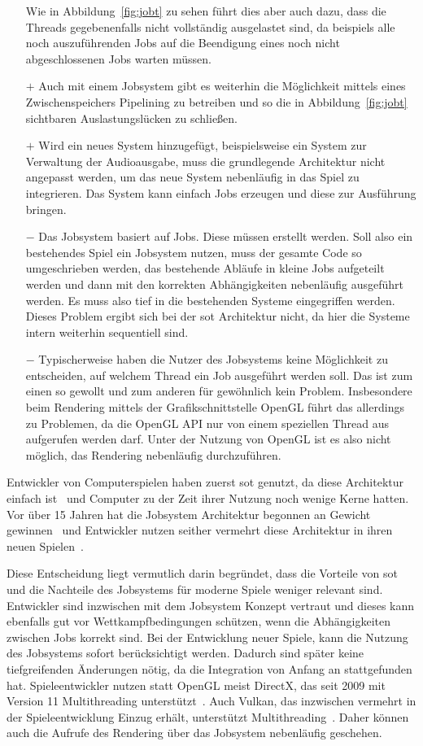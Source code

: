 \begin{itemize}
	Wie in Abbildung~\ref{fig:jobt} zu sehen führt dies aber auch dazu, dass die Threads gegebenenfalls nicht vollständig ausgelastet sind, da beispiels alle noch auszuführenden Jobs auf die Beendigung eines noch nicht abgeschlossenen Jobs warten müssen.
	\item[$+$] Auch mit einem Jobsystem gibt es weiterhin die Möglichkeit mittels eines Zwischenspeichers Pipelining zu betreiben und so die in Abbildung~\ref{fig:jobt} sichtbaren Auslastungslücken zu schließen.
	\item[$+$] Wird ein neues System hinzugefügt, beispielsweise ein System zur Verwaltung der Audioausgabe, muss die grundlegende Architektur nicht angepasst werden, um das neue System nebenläufig in das Spiel zu integrieren. Das System kann einfach Jobs erzeugen und diese zur Ausführung bringen.
	\item[$-$] Das Jobsystem basiert auf Jobs. Diese müssen erstellt werden. Soll also ein bestehendes Spiel ein Jobsystem nutzen, muss der gesamte Code so umgeschrieben werden, das bestehende Abläufe in kleine Jobs aufgeteilt werden und dann mit den korrekten Abhängigkeiten nebenläufig ausgeführt werden. Es muss also tief in die bestehenden Systeme eingegriffen werden. Dieses Problem ergibt sich bei der \ac{sot} Architektur nicht, da hier die Systeme intern weiterhin sequentiell sind.
	\item[$-$] Typischerweise haben die Nutzer des Jobsystems keine Möglichkeit zu entscheiden, auf welchem Thread ein Job ausgeführt werden soll. Das ist zum einen so gewollt und zum anderen für gewöhnlich kein Problem. Insbesondere beim Rendering mittels der Grafikschnittstelle OpenGL führt das allerdings zu Problemen, da die OpenGL API nur von einem speziellen Thread aus aufgerufen werden darf. Unter der Nutzung von OpenGL ist es also nicht möglich, das Rendering nebenläufig durchzuführen.
\end{itemize}

Entwickler von Computerspielen haben zuerst \ac{sot} genutzt, da diese Architektur einfach ist~\cite{Genova2015,Tatarchuk2014} und Computer zu der Zeit ihrer Nutzung noch wenige Kerne hatten. Vor über 15 Jahren hat die Jobsystem Architektur begonnen an Gewicht gewinnen~\cite{Davies2006} und Entwickler nutzen seither vermehrt diese Architektur in ihren neuen Spielen~\cite{Tatarchuk2014,Genova2015,Gyrling2015,Hodgman2016}.

Diese Entscheidung liegt vermutlich darin begründet, dass die Vorteile von \ac{sot}  und die Nachteile des Jobsystems für moderne Spiele weniger relevant sind. Entwickler sind inzwischen mit dem Jobsystem Konzept vertraut und dieses kann ebenfalls gut vor Wettkampfbedingungen schützen, wenn die Abhängigkeiten zwischen Jobs korrekt sind. Bei der Entwicklung neuer Spiele, kann die Nutzung des Jobsystems sofort berücksichtigt werden. Dadurch sind später keine tiefgreifenden Änderungen nötig, da die Integration von Anfang an stattgefunden hat. Spieleentwickler nutzen statt OpenGL meist DirectX, das seit 2009 mit Version 11 Multithreading unterstützt~\cite{White2018}. Auch Vulkan, das inzwischen vermehrt in der Spieleentwicklung Einzug erhält, unterstützt Multithreading~\cite{Schott2016}. Daher können auch die Aufrufe des Rendering über das Jobsystem nebenläufig geschehen.

